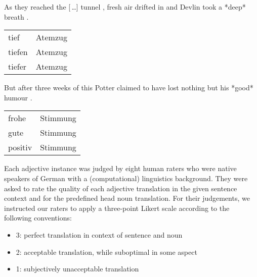 \documentclass[output=paper]{LSP/langsci}
\begin{document}
\begin{exe}
  \ex \label{ex:ratings_presentation-1}  
  As they reached the [\,\dots ] tunnel , fresh air drifted in and Devlin took a *deep* breath . \\[.5ex]
\begin{tabular*}{.9\textwidth}{@{}ll@{}}
tief & Atemzug\\
tiefen & Atemzug\\
tiefer & Atemzug\\
\end{tabular*}
\end{exe}
%
\begin{exe}
\ex  \label{ex:ratings_presentation-2}  
 But after three weeks of this Potter claimed to have lost nothing but his *good* humour .\\[.5ex]
\begin{tabular*}{.9\textwidth}{@{}ll@{}}
frohe & Stimmung\\
gute & Stimmung\\
positiv & Stimmung\\
\end{tabular*}
\end{exe}

\noindent{}Each adjective instance was judged by eight human raters who were
native speakers of German with a (computational) linguistics
background. They were asked to rate the quality of each adjective
translation in the given sentence context and for the predefined head
noun translation. For their judgements, we instructed our raters to
apply a three-point Likert scale according to the following
conventions:

\begin{itemize}
  \item 3: perfect translation in context of sentence and noun
  \item 2: acceptable translation, while suboptimal in some aspect
  \item 1: subjectively unacceptable translation %
\end{itemize}
\end{document}
